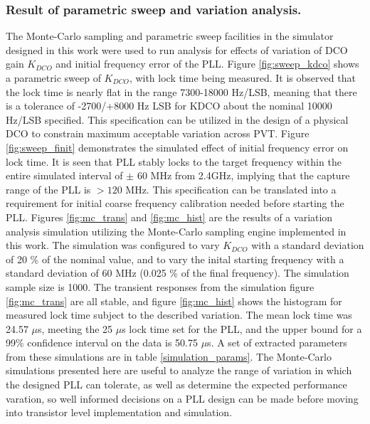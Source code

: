 \subsubsection{Result of parametric sweep and variation analysis.}
The Monte-Carlo sampling and parametric sweep facilities in the simulator designed in this work were used to run analysis for effects of variation of DCO gain $K_{DCO}$ and initial frequency error of the PLL. Figure \ref{fig:sweep_kdco} shows a parametric sweep of $K_{DCO}$, with lock time being measured. It is observed that the lock time is nearly flat in the range 7300-18000 Hz/LSB, meaning that there is a tolerance of -2700/+8000 Hz LSB for KDCO about the nominal 10000 Hz/LSB specified. This specification can be utilized in the design of a physical DCO to constrain maximum acceptable variation across PVT. Figure \ref{fig:sweep_finit} demonstrates the simulated effect of initial frequency error on lock time. It is seen that PLL stably locks to the target frequency within the entire simulated interval of $\pm$ 60 MHz from 2.4GHz, implying that the capture range of the PLL is $>120$ MHz. This specification can be translated into a requirement for initial coarse frequency calibration needed before starting the PLL. Figures \ref{fig:mc_trans} and \ref{fig:mc_hist} are the results of a variation analysis simulation utilizing the Monte-Carlo sampling engine implemented in this work. The simulation was configured to vary $K_{DCO}$ with a standard deviation of 20 \% of the nominal value, and to vary the inital starting frequency with a standard deviation of 60 MHz (0.025 \% of the final frequency). The simulation sample size is 1000. The transient responses from the simulation figure \ref{fig:mc_trans} are all stable, and figure \ref{fig:mc_hist} shows the histogram for measured lock time subject to the described variation. The mean lock time was 24.57 $\mu$s, meeting the 25 $\mu$s lock time set for the PLL, and the upper bound for a 99\% confidence interval on the data is 50.75 $\mu$s. A set of extracted parameters from these simulations are in table \ref{simulation_params}. The Monte-Carlo simulations presented here are useful to analyze the range of variation in which the designed PLL can tolerate, as well as determine the expected performance varation, so well informed decisions on a PLL design can be made before moving into transistor level implementation and simulation. 

